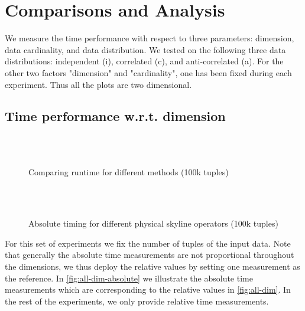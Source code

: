 \section{Comparisons and Analysis}
\label{sec:analysis}
We measure the time performance with respect to three parameters:
dimension, data cardinality, and data distribution.  We tested on the
following three data distributions: independent (i), correlated (c),
and anti-correlated (a).  For the other two factors "dimension" and
"cardinality", one has been fixed during each experiment.  Thus all
the plots are two dimensional.

\subsection{Time performance w.r.t. dimension}

\begin{figure}[htbp]
\centering%
\begin{minipage}{\onecolumnwidth}%
\\
\\
%
\caption{Comparing runtime for different methods (100k tuples)}%
\label{fig:all-dim}%
\end{minipage}%
\hspace{\columnsep}%
\begin{minipage}{\onecolumnwidth}%
\\
\\
%
\caption{Absolute timing for different physical skyline operators (100k tuples)}%
\label{fig:all-dim-absolute}
\end{minipage}%
\end{figure}

For this set of experiments we fix the number of tuples of the input data.
Note that generally the absolute time measurements are not proportional 
throughout the dimensions, we thus deploy the relative values by setting one measurement as
the reference. 
In \autoref{fig:all-dim-absolute}
we illustrate the absolute time measurements which are corresponding to
the relative values in \autoref{fig:all-dim}. 
In the rest of the experiments, we only provide relative time measurements.

